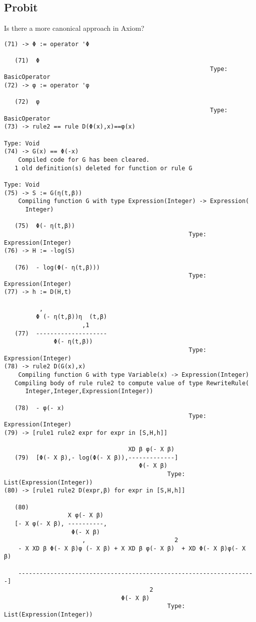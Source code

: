 \documentclass[11pt]{article}
\begin{document}
\subsection{Probit}
\label{sec:orgheadline4}

Is there a more canonical approach in Axiom?

\begin{verbatim}
(71) -> Φ := operator 'Φ

   (71)  Φ
                                                          Type: BasicOperator
(72) -> φ := operator 'φ
 
   (72)  φ
                                                          Type: BasicOperator
(73) -> rule2 == rule D(Φ(x),x)==φ(x)
                                                                    Type: Void
(74) -> G(x) == Φ(-x)
    Compiled code for G has been cleared.
   1 old definition(s) deleted for function or rule G 
                                                                   Type: Void
(75) -> S := G(η(t,β))
    Compiling function G with type Expression(Integer) -> Expression(
      Integer) 

   (75)  Φ(- η(t,β))
                                                    Type: Expression(Integer)
(76) -> H := -log(S)
 
   (76)  - log(Φ(- η(t,β)))
                                                    Type: Expression(Integer)
(77) -> h := D(H,t)
 
          ,
         Φ (- η(t,β))η  (t,β)
                      ,1
   (77)  --------------------
              Φ(- η(t,β))
                                                    Type: Expression(Integer)
(78) -> rule2 D(G(x),x)
    Compiling function G with type Variable(x) -> Expression(Integer) 
   Compiling body of rule rule2 to compute value of type RewriteRule(
      Integer,Integer,Expression(Integer)) 

   (78)  - φ(- x)
                                                    Type: Expression(Integer)
(79) -> [rule1 rule2 expr for expr in [S,H,h]]
 
                                   XD β φ(- X β)
   (79)  [Φ(- X β),- log(Φ(- X β)),-------------]
                                      Φ(- X β)
                                              Type: List(Expression(Integer))
(80) -> [rule1 rule2 D(expr,β) for expr in [S,H,h]]
 
   (80)
                  X φ(- X β)
   [- X φ(- X β), ----------,
                   Φ(- X β)
                      ,                         2
    - X XD β Φ(- X β)φ (- X β) + X XD β φ(- X β)  + XD Φ(- X β)φ(- X β)

    -------------------------------------------------------------------]
                                         2
                                 Φ(- X β)
                                              Type: List(Expression(Integer))
\end{verbatim}
\end{document}
